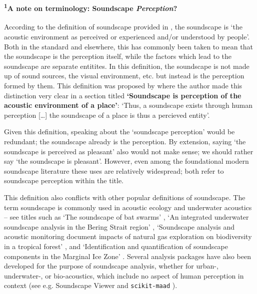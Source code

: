 \newpage


\paragraph*{\textsuperscript{1}A note on terminology: Soundscape \emph{Perception}?}

According to the definition of soundscape provided in \citet{ISO12913Part1}, the soundscape is `the acoustic environment as perceived or experienced and/or understood by people'. Both in the standard and elsewhere, this has commonly been taken to mean that the soundscape is the perception itself, while the factors which lead to the soundscape are separate entitites. In this definition, the soundscape is not made up of sound sources, the visual environment, etc. but instead is the perception formed by them. This definition was proposed by \citet{Brown2012review} where the author made this distinction very clear in a section titled \textbf{`Soundscape is perception of the acoustic environment of a place'}: `Thus, a soundscape exists through human perception [\ldots] the soundscape of a place is thus a percieved entity'.

Given this definition, speaking about the `soundscape perception' would be redundant; the soundscape already is the perception. By extension, saying `the soundscape is perceived as pleasant' also would not make sense; we should rather say `the soundscape is pleasant'. However, even among the foundational modern soundscape literature these uses are relatively widespread; \citet{Axelsson2010principal,Liu2014Effects} both refer to soundscape perception within the title.

This definition also conflicts with other popular definitions of soundscape. The term soundscape is commonly used in acoustic ecology and underwater acoustics -- see titles such as `The soundscape of bat swarms' \citep{Kloepper2017soundscape}, `An integrated underwater soundscape analysis in the Bering Strait region' \citep{McKenna2021integrated}, `Soundscape analysis and acoustic monitoring document impacts of natural gas exploration on biodiversity in a tropical forest' \citep{Deichmann2017Soundscape}, and `Identification and quantification of soundscape components in the Marginal Ice Zone' \citep{Geyer2016Identification}. Several analysis packages have also been developed for the purpose of soundscape analysis, whether for urban-, underwater-, or bio-acoustics, which include no aspect of human perception in context (see e.g. Soundscape Viewer \citep{Sun2020Soundscape} and \texttt{scikit-maad} \citep{Ulloa2021scikit}). 

